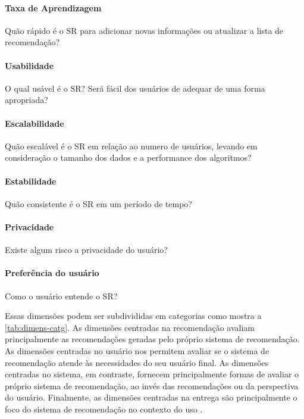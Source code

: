 \paragraph*{Taxa de Aprendizagem}
Quão rápido é o SR para adicionar novas informações ou atualizar a lista de recomendação?

\paragraph*{Usabilidade}
O qual usável é o SR? Será fácil dos usuários de adequar de uma forma apropriada?

\paragraph*{Escalabilidade}
Quão escalável é o SR em relação ao numero de usuários, levando em consideração o tamanho dos dados e a performance dos algoritmos?

\paragraph*{Estabilidade}
Quão consistente é o SR em um período de tempo?

\paragraph*{Privacidade}
Existe algum risco a privacidade do usuário?

\paragraph*{Preferência do usuário}
Como o usuário entende o SR?

Essas dimensões podem ser subdivididas em categorias como mostra a \ref{tab:dimens-catg}. As dimensões centradas na recomendação avaliam principalmente as recomendações geradas pelo próprio sistema de recomendação. As dimensões centradas no usuário nos permitem avaliar se o sistema de recomendação atende às necessidades do seu usuário final. As dimensões centradas no sistema, em contraste, fornecem principalmente formas de avaliar o próprio sistema de recomendação, ao invés das recomendações ou da perspectiva do usuário. Finalmente, as dimensões centradas na entrega são principalmente o foco do sistema de recomendação no contexto do uso \cite{robillard2010recommendation}.


